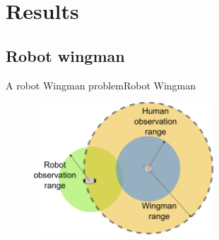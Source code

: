 \section{Results}

\subsection{Robot wingman}

\begin{frame}{A robot Wingman problem}{Robot Wingman}

\begin{figure}
\centering
\includegraphics[width = 0.6\textwidth]{./figure/Wingman}
\end{figure}

\end{frame}

